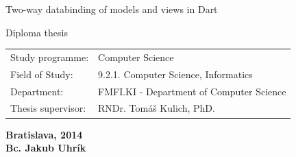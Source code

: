 \documentclass[oneside, 12pt]{book}
\def\mftitle{Two-way databinding of models and views in Dart}          %
\def\mfthesistype{Diploma thesis}             %
\def\mfauthor{Bc. Jakub Uhrík}                            %
\def\mfadvisor{RNDr. Tomáš Kulich, PhD.}                                  %
\def\mfplacedate{Bratislava, 2014}                        %
\def\mfprogram{Computer Science}                               %
\def\mfodbor{9.2.1. Computer Science, Informatics}                            %
\def\mfpracovisko{FMFI.KI - Department of Computer Science}                    %
\begin{document}
\vfill
\begin{center}
\begin{minipage}{1\textwidth}
\bigskip\bigskip
\begin{center}
\linespread{1}\LARGE\sc\mftitle
\end{center}
\smallskip
\centerline{\mfthesistype}
\bigskip
\bigskip
\bigskip\bigskip
\end{minipage}
\end{center}
\vfill
\begin{minipage}{0.8\textwidth}
\begin{tabular}{l l}
Study programme:& \mfprogram \\
Field of Study:& \mfodbor \\
Department:& \mfpracovisko\\
Thesis supervisor:&   \mfadvisor \\
\end{tabular}
\end{minipage}
\begin{center}
\end{center}
\vfill
{\bf\mfplacedate\\
\indent\mfauthor}
\eject 







% 




%
\end{document}

